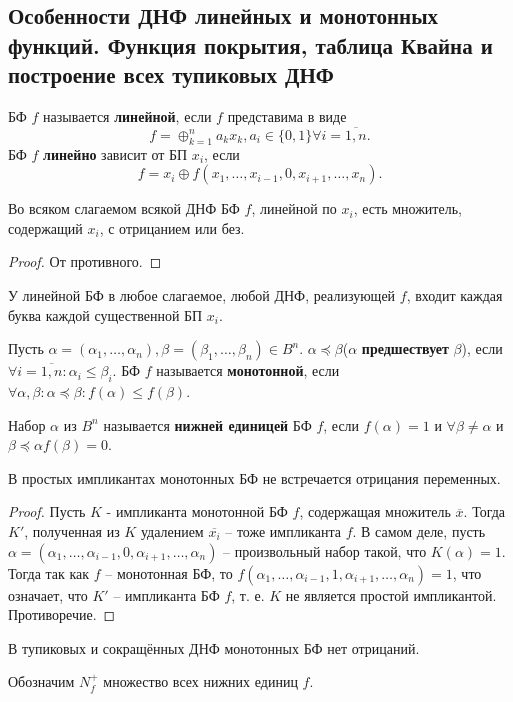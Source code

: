 \documentclass[11pt]{article}
\newcounter{th}\setcounter{th}{0}
\newcounter{cnsqnc}\setcounter{cnsqnc}{0}
\def\cnsqnc{\par\smallskip\refstepcounter{cnsqnc}\textbf{\arabic{cnsqnc}}}
\newtheorem*{Consequence}{Следствие \cnsqnc}
\newcounter{stnmt}\setcounter{stnmt}{0}
\def\st{\par\smallskip\refstepcounter{stnmt}\textbf{\arabic{stnmt}}}
\newtheorem*{Statement}{Утверждение \st}
\begin{document}
\subsection{Особенности ДНФ линейных и монотонных функций. Функция покрытия, таблица Квайна и построение всех тупиковых ДНФ}
\label{sec:org5c677fd}
БФ \(f\) называется \textbf{линейной}, если \(f\) представима в виде
\begin{equation*}
f = \oplus_{k = 1}^na_kx_k, a_i \in \{0, 1\} \forall i = \overline{1, n}.
\end{equation*}
БФ \(f\) \textbf{линейно} зависит от БП \(x_i\), если
\begin{equation*}
f = x_i \oplus f(x_1, \ldots, x_{i - 1}, 0, x_{i + 1}, \ldots, x_n).
\end{equation*}
\begin{Statement}
Во всяком слагаемом всякой ДНФ БФ $f$, линейной по $x_i$, есть множитель, содержащий $x_i$, с
отрицанием или без.
\end{Statement}
\begin{proof}
От противного.
\end{proof}
\begin{Consequence}
У линейной БФ в любое слагаемое, любой ДНФ, реализующей $f$, входит каждая буква каждой
существенной БП $x_i$.
\end{Consequence}
Пусть \(\alpha = (\alpha_1, \ldots, \alpha_n), \beta = (\beta_1, \ldots, \beta_n) \in B^n\).
\(\alpha \preceq \beta\)(\(\alpha\) \textbf{предшествует} \(\beta\)), если
\(\forall i = \overline{1, n}: \alpha_i \leq \beta_i\). БФ \(f\) называется \textbf{монотонной}, если
\(\forall \alpha, \beta: \alpha \preceq \beta: f(\alpha) \leq f(\beta)\).

Набор \(\alpha\) из \(B^n\) называется \textbf{нижней единицей} БФ \(f\), если \(f(\alpha) = 1\) и
\(\forall \beta \neq \alpha\) и \(\beta \preceq \alpha f(\beta) = 0\).
\begin{Statement}
В простых импликантах монотонных БФ не встречается отрицания переменных.
\end{Statement}
\begin{proof}
Пусть $K$ - импликанта монотонной БФ $f$, содержащая множитель $\overline{x}$. Тогда $K'$,
полученная из $K$ удалением $\overline{x_i}$ -- тоже импликанта $f$. В самом деле, пусть
$\alpha = (\alpha_1, \ldots, \alpha_{i - 1}, 0, \alpha_{i + 1}, \ldots, \alpha_n)$ -- произвольный
набор такой, что $K(\alpha) = 1$. Тогда так как $f$ -- монотонная БФ, то
$f(\alpha_1, \ldots, \alpha_{i - 1}, 1, \alpha_{i + 1}, \ldots, \alpha_n) = 1$, что означает, что
$K'$ -- импликанта БФ $f$, т. е. $K$ не является простой импликантой. Противоречие.
\end{proof}
\begin{Consequence}
В тупиковых и сокращённых ДНФ монотонных БФ нет отрицаний.
\end{Consequence}
Обозначим \(N_f^+\) множество всех нижних единиц \(f\).
\end{document}
